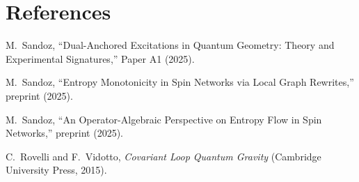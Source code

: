 \documentclass[11pt]{article}
\theoremstyle{plain}
\theoremstyle{definition}
\begin{document}
\section*{References}
\begin{thebibliography}{99}

  M.~Sandoz,
  ``Dual-Anchored Excitations in Quantum Geometry: Theory and Experimental Signatures,''
  Paper A1 (2025).

  M.~Sandoz,
  ``Entropy Monotonicity in Spin Networks via Local Graph Rewrites,''
  preprint (2025).

  M.~Sandoz,
  ``An Operator-Algebraic Perspective on Entropy Flow in Spin Networks,''
  preprint (2025).

  C.~Rovelli and F.~Vidotto,
  \emph{Covariant Loop Quantum Gravity} (Cambridge University Press, 2015).

\end{thebibliography}
\end{document}
